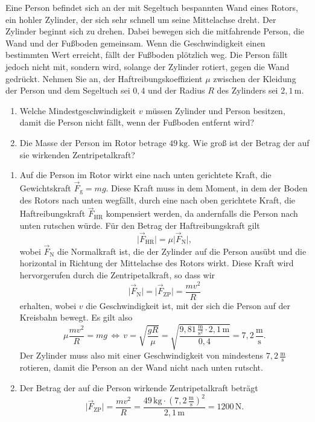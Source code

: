 \begin{MExercises}
  \begin{MExercise}
   Eine Person befindet sich an der mit Segeltuch bespannten Wand eines Rotors, ein hohler Zylinder, der sich sehr schnell um seine Mittelachse dreht. Der Zylinder beginnt sich zu drehen. Dabei bewegen sich die mitfahrende Person, die Wand und der Fu{\ss}boden gemeinsam. Wenn die Geschwindigkeit einen bestimmten Wert erreicht, f\"allt der Fu{\ss}boden pl\"otzlich weg. Die Person f\"allt jedoch nicht mit, sondern wird, solange der Zylinder rotiert, gegen die Wand gedr\"uckt. Nehmen Sie an, der Haftreibungskoeffizient $\mu$ zwischen der Kleidung der Person und dem Segeltuch sei $0{,}4$ und der Radius $R$ des Zylinders sei $2{,}1\,\text{m}$.
   \begin{enumerate}
   \item Welche Mindestgeschwindigkeit $v$ m\"ussen Zylinder und Person besitzen, damit die Person nicht f\"allt, wenn der Fu{\ss}boden entfernt wird?
   \item Die Masse der Person im Rotor betrage  $49\,\text{kg}$. Wie gro{\ss} ist der Betrag der auf sie wirkenden Zentripetalkraft?
   \end{enumerate}
   \begin{MSolution}
   \begin{enumerate}
   \item Auf die Person im Rotor wirkt eine nach unten gerichtete Kraft, die Gewichtskraft $\vec{F}_{\textrm{g}}=mg$. Diese Kraft muss in dem Moment, in dem der Boden des Rotors nach unten wegf\"allt, durch eine nach oben gerichtete Kraft, die Haftreibungskraft $\vec{F}_{\textrm{HR}}$ kompensiert werden, da andernfalls die Person nach unten rutschen w\"urde. F\"ur den Betrag der Haftreibungskraft gilt
   \begin{equation}
   \vert\vec{F}_{\textrm{HR}}\vert=\mu\vert\vec{F}_{\textrm{N}}\vert,
   \end{equation}wobei $\vec{F}_{\textrm{N}}$ die Normalkraft ist, die der Zylinder auf die Person aus\"ubt und die horizontal in Richtung der Mittelachse des Rotors wirkt. Diese Kraft wird hervorgerufen durch die Zentripetalkraft, so dass wir
   \begin{equation}
   \vert\vec{F}_{\textrm{N}}\vert=\vert\vec{F}_{\textrm{ZP}}\vert=\frac{mv^2}{R}
   \end{equation}erhalten, wobei $v$ die Geschwindigkeit ist, mit der sich die Person auf der Kreisbahn bewegt. Es gilt also
   \begin{equation}
   \mu \frac{mv^2}{R}=mg\,\Leftrightarrow\, v=\sqrt{\frac{gR}{\mu}}=\sqrt{\frac{9{,}81\,\frac{\text{m}}{\text{s}^2}\cdot 2{,}1\,\text{m}}{0{,}4}}=7{,}2\,\frac{\text{m}}{\text{s}}.
   \end{equation}
   Der Zylinder muss also mit einer Geschwindigkeit von mindestens $7{,}2\,\frac{\text{m}}{\text{s}}$ rotieren, damit die Person an der Wand nicht nach unten rutscht.
   \item Der Betrag der auf die Person wirkende Zentripetalkraft betr\"agt
   $$
   \vert\vec{F}_{\textrm{ZP}}\vert=\frac{mv^2}{R}=\frac{49\,\text{kg}\cdot (7,2\,\frac{\text{m}}{\text{s}})^2}{2{,}1\,\text{m}}=1200\,\text{N.}
   $$
   

\end{enumerate}
\end{MSolution}
\end{MExercise}
\end{MExercises}
